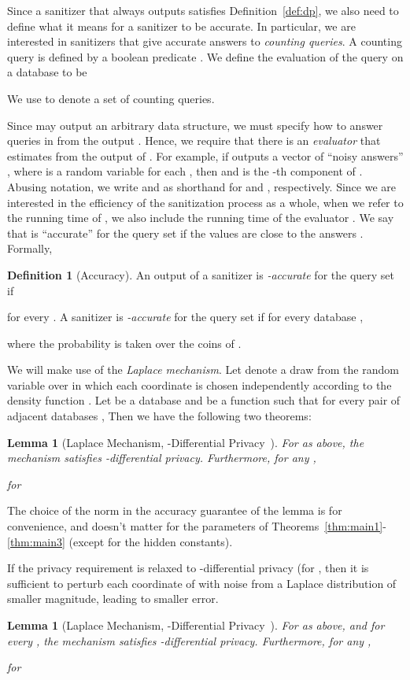 \documentclass[11pt]{article}
\newtheorem{lemma}[theorem]{Lemma}
\theoremstyle{definition}
\newtheorem{definition}[theorem]{Definition}
\begin{document}
Since a sanitizer that always outputs  satisfies Definition~\ref{def:dp}, we also need to define what it means for a sanitizer to be accurate.  In particular, we are interested in sanitizers that give accurate answers to \emph{counting queries}.  A counting query is defined by a boolean predicate .  We define the evaluation of the query  on a database  to be

We use  to denote a set of counting queries.

Since  may output an arbitrary data structure, we must specify how to answer queries in  from the output .  Hence, we require that there is an \emph{evaluator}  that estimates  from the output of .  For example, if  outputs a vector of ``noisy answers'' , where  is a random variable for each , then  and  is the -th component of .  Abusing notation, we write  and  as shorthand for  and , respectively.  Since we are interested in the efficiency of the sanitization process as a whole, when we refer to the running time of , we also include the running time of the evaluator .  We say that  is ``accurate'' for the query set  if the values  are close to the answers .  Formally,
\begin{definition}[Accuracy]\label{def:acc}
An output  of a sanitizer  is \emph{-accurate} for the query set  if

for every .  A sanitizer is \emph{-accurate} for the query set  if for every database ,

where the probability is taken over the coins of .
\end{definition}

We will make use of the \emph{Laplace mechanism}.  Let  denote a draw from the random variable over  in which each coordinate is chosen independently according to the density function .  Let  be a database and  be a function such that for every pair of adjacent databases ,   Then we have the following two theorems:
\begin{lemma}[Laplace Mechanism, -Differential Privacy~\cite{DworkMcNiSm06}] \label{thm:laplacemech}
For  as above, the mechanism  satisfies -differential privacy.  Furthermore, for any ,

for

\end{lemma}
The choice of the  norm in the accuracy guarantee of the lemma is for convenience, and doesn't matter for the parameters of Theorems~\ref{thm:main1}-\ref{thm:main3} (except for the hidden constants).

\ifnum{}
If the privacy requirement is relaxed to -differential privacy (for , then it is sufficient to perturb each coordinate of  with noise from a Laplace distribution of smaller magnitude, leading to smaller error. 
\begin{lemma}[Laplace Mechanism, -Differential Privacy~\cite{DinurNi03,DworkNi04,BlumDwMcNi05,DworkRoVa10}] \label{thm:advcomp}
For  as above, and for every , the mechanism  satisfies -differential privacy.
Furthermore, for any ,

for

\end{lemma}
\else
\end{document}
